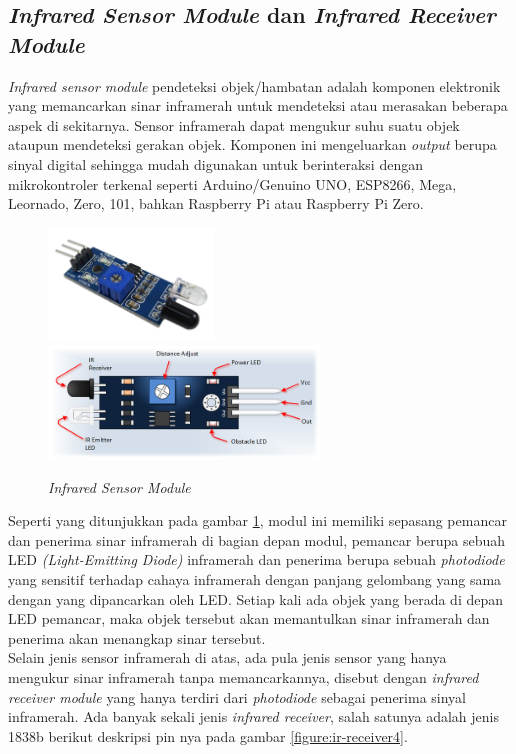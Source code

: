 \subsection{\textit{Infrared Sensor Module} dan \textit{Infrared Receiver Module}}
\tab \textit{Infrared sensor module} pendeteksi objek/hambatan adalah komponen elektronik yang memancarkan sinar inframerah untuk mendeteksi atau merasakan beberapa aspek di sekitarnya. Sensor inframerah dapat mengukur suhu suatu objek ataupun mendeteksi gerakan objek. Komponen ini mengeluarkan \textit{output} berupa sinyal digital sehingga mudah digunakan untuk berinteraksi dengan mikrokontroler terkenal seperti Arduino/Genuino UNO, ESP8266, Mega, Leornado, Zero, 101, bahkan Raspberry Pi atau Raspberry Pi Zero.\\

\begin{figure}[H]
	\centerline {
		\includegraphics[height=3cm]{bab3/img/ir-sensor.png}
		\includegraphics[height=3cm]{bab3/img/ir-sensor-pin.png}
	}
	\caption{\textit{Infrared Sensor Module}}
	\label{figure:ir-sensor}
\end{figure}

Seperti yang ditunjukkan pada gambar \ref{figure:ir-sensor}, modul ini memiliki sepasang pemancar dan penerima sinar inframerah di bagian depan modul, pemancar berupa sebuah LED \textit{(Light-Emitting Diode)} inframerah dan penerima berupa sebuah \textit{photodiode} yang sensitif terhadap cahaya inframerah dengan panjang gelombang yang sama dengan yang dipancarkan oleh LED. Setiap kali ada objek yang berada di depan LED pemancar, maka objek tersebut akan memantulkan sinar inframerah dan penerima akan menangkap sinar tersebut. \\
\tab Selain jenis sensor inframerah di atas, ada pula jenis sensor yang hanya mengukur sinar inframerah tanpa memancarkannya, disebut dengan \textit{infrared receiver module} yang hanya terdiri dari \textit{photodiode} sebagai penerima sinyal inframerah. Ada banyak sekali jenis \textit{infrared receiver}, salah satunya adalah jenis 1838b berikut deskripsi pin nya pada gambar \ref{figure:ir-receiver4}.


